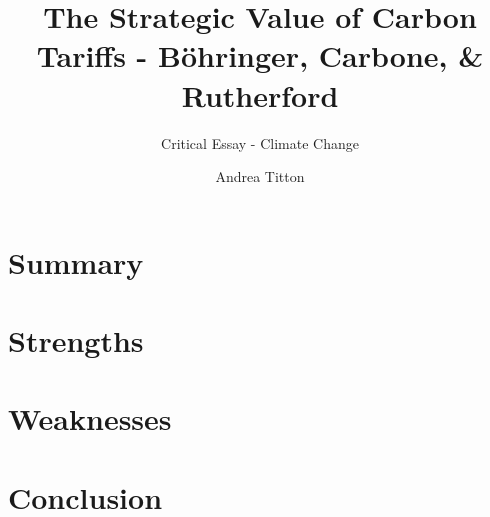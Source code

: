 \documentclass[american]{scrartcl}
\title{The Strategic Value of Carbon Tariffs - Böhringer, Carbone, \& Rutherford}
\subtitle{Critical Essay - Climate Change}
\author{Andrea Titton}
\begin{document}
\maketitle

\maketitle


\section{Summary}

\newpage
\section{Strengths}

\newpage
\section{Weaknesses}

\newpage
\section{Conclusion}


\newpage
\nocite{*}
\printbibliography
\end{document}

